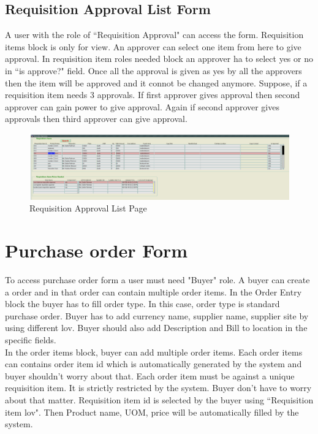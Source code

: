 \documentclass[12pt]{report} %
\begin{document}
\begin{landscape}
\section{Requisition Approval List Form}
A user with the role of ``Requisition Approval" can access the form. Requisition items block is only for view. An approver can select one item from here to give approval. In requisition item roles needed block an approver ha to select yes or no in ``is approve?" field. Once all the approval is given as yes by all the approvers then the item will be approved and it connot be changed anymore.
Suppose, if a requisition item needs 3 approvals. If first approver gives approval then second approver can gain power to give approval. Again if second approver gives approvals then third approver can give approval. 
\begin{figure}[h]
	\begin{center}
		\includegraphics[width=1.35\textwidth]{pic/req_approval_list.png}
	\end{center}
	\caption{Requisition Approval List Page}
	\label{fig:req_approval_list}
\end{figure}
\thispagestyle{empty} 
\end{landscape}
\clearpage
\restoregeometry






\section{Purchase order Form}
To access purchase order form a user must need "Buyer" role. A buyer can create a order and in that order can contain multiple order items. In the Order Entry block the buyer has to fill order type. In this case, order type is standard purchase order. Buyer has to add currency name, supplier name, supplier site by using different lov. Buyer should also add Description and Bill to location in the specific fields. \\

In the order items block, buyer can add multiple order items. Each order items can contains order item id which is automatically generated by the system and buyer shouldn't worry about that. Each order item must be against a unique requisition item. It is strictly restricted by the system. Buyer don't have to worry about that matter. Requisition item id is selected by the buyer using ``Requisition item lov". Then Product name, UOM, price will be automatically filled by the system.\\
\end{document}
